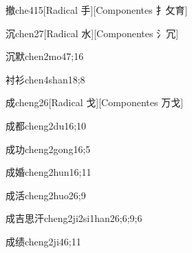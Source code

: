 \begin{verbete}{撤}{che4}{15}[Radical 手][Componentes ⺘攵育]
\end{verbete}

\begin{verbete}{沉}{chen2}{7}[Radical 水][Componentes ⺡冗]
\end{verbete}

\begin{verbete}{沉默}{chen2mo4}{7;16}
\end{verbete}

\begin{verbete}{衬衫}{chen4shan1}{8;8}
\end{verbete}

\begin{verbete}{成}{cheng2}{6}[Radical ⼽][Componentes 万戈]
\end{verbete}

\begin{verbete}{成都}{cheng2du1}{6;10}
\end{verbete}

\begin{verbete}{成功}{cheng2gong1}{6;5}
\end{verbete}

\begin{verbete}{成婚}{cheng2hun1}{6;11}
\end{verbete}

\begin{verbete}{成活}{cheng2huo2}{6;9}
\end{verbete}

\begin{verbete}{成吉思汗}{cheng2ji2si1han2}{6;6;9;6}
\end{verbete}

\begin{verbete}{成绩}{cheng2ji4}{6;11}
\end{verbete}

